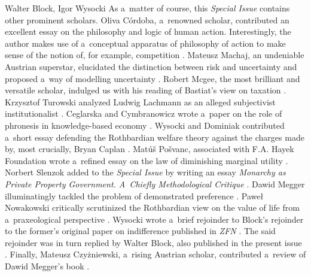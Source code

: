 \begin{editorialeng}{Walter Block, Igor Wysocki}
As a~matter of course, this \textit{Special Issue} contains other prominent scholars. Oliva Córdoba, a~renowned scholar, contributed an excellent essay on the philosophy and logic of human action. Interestingly, the author makes use of a~conceptual apparatus of philosophy of action to make sense of the notion of, for example, competition 
\parencite[][]{oliva_cordoba_philosophy_2024}. %
 Mateusz Machaj, an undeniable Austrian superstar, elucidated the distinction between risk and uncertainty and proposed a~way of modelling uncertainty 
\parencite[][]{machaj_model_2024}. %
 Robert Mcgee, the most brilliant and versatile scholar, indulged us with his reading of Bastiat's view on taxation 
\parencite[][]{mcgee_taxation_2024}. %
 Krzysztof Turowski analyzed Ludwig Lachmann as an alleged subjectivist institutionalist 
\parencite[][]{turowski_ludwig_2024}. %
 Ceglarska and Cymbranowicz wrote a~paper on the role of phronesis in knowledge-based economy 
\parencite[][]{ceglarska_role_2024}. %
 Wysocki and Dominiak contributed a~short essay defending the Rothbardian welfare theory against the charges made by, most crucially, Bryan Caplan 
\parencite[][]{wysocki_rejoinder_2024}. %
 Matúš Pošvanc, associated with F.A. Hayek Foundation wrote a~refined essay on the law of diminishing marginal utility 
\parencite[][]{posvanc_law_2024}. %
 Norbert Slenzok added to the \textit{Special Issue} by writing an essay \textit{Monarchy as Private Property Government. A~Chiefly Methodological Critique} 
\parencite[][]{slenzok_monarchy_2024}. %
 Dawid Megger illuminatingly tackled the problem of demonstrated preference 
\parencite[][]{megger_demonstrated_2024}. %
 Paweł Nowakowski critically scrutinized the Rothbardian view on the value of life from a~praxeological perspective 
\parencite[][]{nowakowski_praxeology_2024}. %
 Wysocki wrote a~brief rejoinder to Block's rejoinder to the former's original paper on indifference published in \textit{ZFN} 
\parencite[][]{wysocki_rejoinder_2024}. %
 The said rejoinder was in turn replied by Walter Block, also published in the present issue 
\parencite[][]{block_response_2024}. %
 Finally, Mateusz Czyżniewski, a~rising Austrian scholar, contributed a~review of Dawid Megger's book 
\parencite[][]{czyzniewski_are_2024}.%





\end{editorialeng}
